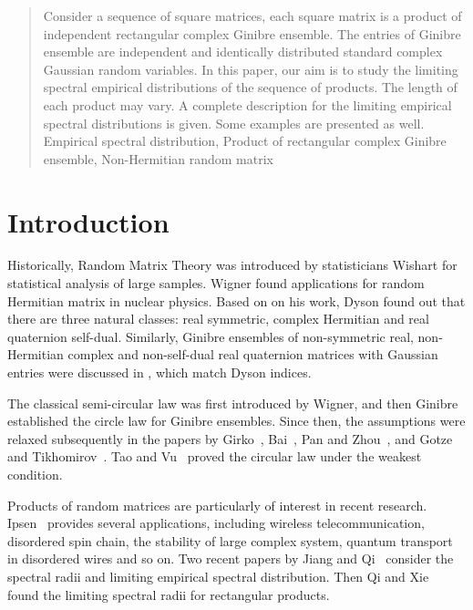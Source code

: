 \documentclass[12pt]{article}
\theoremstyle{plain}
\theoremstyle{definition}
\theoremstyle{remark}
\begin{document}
\begin{abstract}
Consider a sequence of square matrices, each square matrix is a
product of independent rectangular complex Ginibre ensemble. The
entries of Ginibre ensemble are independent and identically
distributed standard complex Gaussian random variables. In this
paper, our aim is to study the limiting spectral empirical
distributions of the sequence of products. The length of each
product may vary. A complete description for the limiting empirical
spectral distributions is given. Some
examples are presented as well. \\

 Empirical spectral distribution, Product
of rectangular complex Ginibre ensemble, Non-Hermitian random matrix
\end{abstract}


\newpage
\tableofcontents

\newpage



\section{Introduction}\label{sec:intro}
Historically, Random Matrix Theory was introduced by statisticians
Wishart\cite{wishart} for statistical analysis of large samples.
Wigner found applications for random Hermitian matrix in nuclear
physics. Based on on his work, Dyson \cite{Dyson} found out that
there are three natural classes: real symmetric, complex Hermitian
and real quaternion self-dual. Similarly, Ginibre ensembles of
non-symmetric real, non-Hermitian complex and non-self-dual real
quaternion matrices with Gaussian entries were discussed in
\cite{Ginibre}, which match Dyson indices.

The classical semi-circular law was first introduced by Wigner, and
then Ginibre\cite{Ginibre} established the circle law for Ginibre
ensembles. Since then, the assumptions were relaxed subsequently in
the papers by Girko~\cite{Girko},  Bai~\cite{Bai},  Pan and
Zhou~\cite{Pan}, and Gotze and Tikhomirov~\cite{GF-TA}. Tao and
Vu~\cite{Tao} proved the circular law under the weakest condition.

Products of random matrices are particularly of interest in recent
research. Ipsen~\cite{Ipsen} provides several applications,
including wireless telecommunication, disordered spin chain, the
stability of large complex system, quantum transport in disordered
wires and so on. Two recent papers by Jiang and
Qi~\cite{JiangQi2019, 2017} consider the spectral radii and limiting
empirical spectral distribution. Then Qi and Xie~\cite{SRP} found
the limiting spectral radii for rectangular products.
\end{document}
